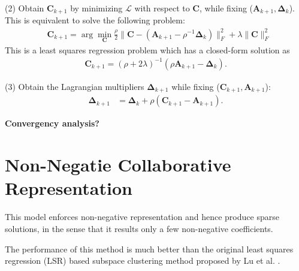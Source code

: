 \documentclass[10pt,twocolumn,letterpaper]{article}
\begin{document}
(2) Obtain $\bm{C}_{k+1}$ by minimizing $\mathcal{L}$ with respect to $\bm{C}$, while fixing ($\bm{A}_{k+1},\bm{\Delta}_{k}$). This is equivalent to solve the following problem:
\begin{equation}
\begin{split}
\label{e8}
&
\bm{C}_{k+1}
=
\arg\min_{\bm{C}}
\frac{\rho}{2}
\|
\bm{C}-(\bm{A}_{k+1}-\rho^{-1}\bm{\Delta}_{k})
\|_{F}^{2}
+
\lambda
\|
\bm{C}
\|_{F}^{2}
\end{split}
\end{equation}
This is a least squares regression problem which has a closed-form solution as 
\begin{equation}
\begin{split}
\label{e9}
\bm{C}_{k+1} 
=
(\rho+2\lambda)^{-1}(\rho\bm{A}_{k+1}-\bm{\Delta}_{k}).
\end{split}
\end{equation}

(3) Obtain the Lagrangian multipliers $\bm{\Delta}_{k+1}$ while fixing ($\bm{C}_{k+1},\bm{A}_{k+1}$):
\begin{equation}
\begin{split}
\label{e10}
\bm{\Delta}_{k+1}
&
=
\bm{\Delta}_{k}
+
\rho
(\bm{C}_{k+1}-\bm{A}_{k+1})
.
\end{split}
\end{equation}

\textbf{Convergency analysis?}

\section{Non-Negatie Collaborative Representation}

This model enforces non-negative representation and hence produce sparse solutions, in the sense that it results only a few non-negative coefficients.

The performance of this method is much better than the original least squares regression (LSR) based subspace clustering method proposed by Lu et al. \cite{lsr}.
\end{document}
